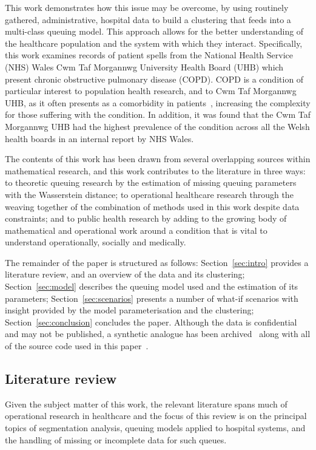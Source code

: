 \documentclass[11pt]{article}
\begin{document}
This work demonstrates how this issue may be overcome, by using routinely
gathered, administrative, hospital data to build a clustering that feeds into a
multi-class queuing model. This approach allows for the better understanding of
the healthcare population and the system with which they interact. Specifically,
this work examines records of patient spells from the National Health Service
(NHS) Wales Cwm Taf Morgannwg University Health Board (UHB) which present
chronic obstructive pulmonary disease (COPD). COPD is a condition of particular
interest to population health research, and to Cwm Taf Morgannwg UHB, as it
often presents as a comorbidity in patients~\cite{Houben2019}, increasing the
complexity for those suffering with the condition. In addition, it was found
that the Cwm Taf Morgannwg UHB had the highest prevalence of the condition
across all the Welsh health boards in an internal report by NHS Wales.

The contents of this work has been drawn from several overlapping sources within
mathematical research, and this work contributes to the literature in three
ways: to theoretic queuing research by the estimation of missing queuing
parameters with the Wasserstein distance; to operational healthcare research
through the weaving together of the combination of methods used in this work
despite data constraints; and to public health research by adding to the growing
body of mathematical and operational work around a condition that is vital to
understand operationally, socially and medically.

The remainder of the paper is structured as follows: Section~\ref{sec:intro}
provides a literature review, and an overview of the data and its clustering;
Section~\ref{sec:model} describes the queuing model used and the estimation of
its parameters; Section~\ref{sec:scenarios} presents a number of what-if
scenarios with insight provided by the model parameterisation and the
clustering; Section~\ref{sec:conclusion} concludes the paper. Although the data
is confidential and may not be published, a synthetic analogue has been
archived~\cite{Wilde2020synthetic} along with all of the source code used in
this paper~\cite{Wilde2020github}.


\subsection{Literature review}\label{subsec:review}

Given the subject matter of this work, the relevant literature spans much of
operational research in healthcare and the focus of this review is on the
principal topics of segmentation analysis, queuing models applied to hospital
systems, and the handling of missing or incomplete data for such queues.
\end{document}
